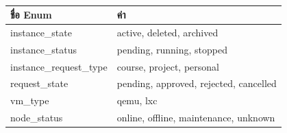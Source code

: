 \begin{table}[htbp]
    \caption{}\label{tab3:db_enums}
    \centering
    \renewcommand{\arraystretch}{1.2}
    \small
    \begin{tabular}{p{} p{}}
        \hline
            \textbf{ชื่อ Enum} & \textbf{ค่า} \\
        \hline
        instance\_state & active, deleted, archived \\
        instance\_status & pending, running, stopped \\
        instance\_request\_type & course, project, personal \\
        request\_state & pending, approved, rejected, cancelled \\
        vm\_type & qemu, lxc \\
        node\_status & online, offline, maintenance, unknown \\
        \hline
    \end{tabular}
\end{table}


